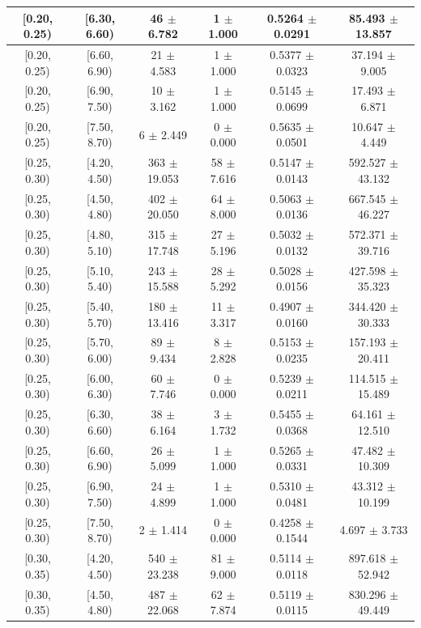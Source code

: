 \begin{longtable}{|c|c|c|c|c|c|}
\hline
[0.20, 0.25) & [6.30, 6.60) & 46 $\pm$ 6.782 & 1 $\pm$ 1.000 & 0.5264 $\pm$ 0.0291 & 85.493 $\pm$ 13.857 \\ 
\hline
[0.20, 0.25) & [6.60, 6.90) & 21 $\pm$ 4.583 & 1 $\pm$ 1.000 & 0.5377 $\pm$ 0.0323 & 37.194 $\pm$ 9.005 \\ 
\hline
[0.20, 0.25) & [6.90, 7.50) & 10 $\pm$ 3.162 & 1 $\pm$ 1.000 & 0.5145 $\pm$ 0.0699 & 17.493 $\pm$ 6.871 \\ 
\hline
[0.20, 0.25) & [7.50, 8.70) & 6 $\pm$ 2.449 & 0 $\pm$ 0.000 & 0.5635 $\pm$ 0.0501 & 10.647 $\pm$ 4.449 \\ 
\hline
[0.25, 0.30) & [4.20, 4.50) & 363 $\pm$ 19.053 & 58 $\pm$ 7.616 & 0.5147 $\pm$ 0.0143 & 592.527 $\pm$ 43.132 \\ 
\hline
[0.25, 0.30) & [4.50, 4.80) & 402 $\pm$ 20.050 & 64 $\pm$ 8.000 & 0.5063 $\pm$ 0.0136 & 667.545 $\pm$ 46.227 \\ 
\hline
[0.25, 0.30) & [4.80, 5.10) & 315 $\pm$ 17.748 & 27 $\pm$ 5.196 & 0.5032 $\pm$ 0.0132 & 572.371 $\pm$ 39.716 \\ 
\hline
[0.25, 0.30) & [5.10, 5.40) & 243 $\pm$ 15.588 & 28 $\pm$ 5.292 & 0.5028 $\pm$ 0.0156 & 427.598 $\pm$ 35.323 \\ 
\hline
[0.25, 0.30) & [5.40, 5.70) & 180 $\pm$ 13.416 & 11 $\pm$ 3.317 & 0.4907 $\pm$ 0.0160 & 344.420 $\pm$ 30.333 \\ 
\hline
[0.25, 0.30) & [5.70, 6.00) & 89 $\pm$ 9.434 & 8 $\pm$ 2.828 & 0.5153 $\pm$ 0.0235 & 157.193 $\pm$ 20.411 \\ 
\hline
[0.25, 0.30) & [6.00, 6.30) & 60 $\pm$ 7.746 & 0 $\pm$ 0.000 & 0.5239 $\pm$ 0.0211 & 114.515 $\pm$ 15.489 \\ 
\hline
[0.25, 0.30) & [6.30, 6.60) & 38 $\pm$ 6.164 & 3 $\pm$ 1.732 & 0.5455 $\pm$ 0.0368 & 64.161 $\pm$ 12.510 \\ 
\hline
[0.25, 0.30) & [6.60, 6.90) & 26 $\pm$ 5.099 & 1 $\pm$ 1.000 & 0.5265 $\pm$ 0.0331 & 47.482 $\pm$ 10.309 \\ 
\hline
[0.25, 0.30) & [6.90, 7.50) & 24 $\pm$ 4.899 & 1 $\pm$ 1.000 & 0.5310 $\pm$ 0.0481 & 43.312 $\pm$ 10.199 \\ 
\hline
[0.25, 0.30) & [7.50, 8.70) & 2 $\pm$ 1.414 & 0 $\pm$ 0.000 & 0.4258 $\pm$ 0.1544 & 4.697 $\pm$ 3.733 \\ 
\hline
[0.30, 0.35) & [4.20, 4.50) & 540 $\pm$ 23.238 & 81 $\pm$ 9.000 & 0.5114 $\pm$ 0.0118 & 897.618 $\pm$ 52.942 \\ 
\hline
[0.30, 0.35) & [4.50, 4.80) & 487 $\pm$ 22.068 & 62 $\pm$ 7.874 & 0.5119 $\pm$ 0.0115 & 830.296 $\pm$ 49.449 \\ 

\end{longtable}
